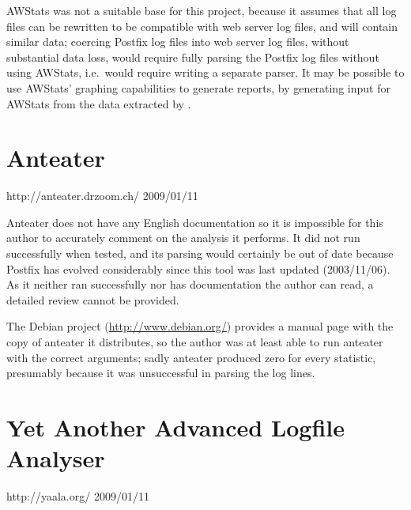 AWStats was not a suitable base for this project, because it assumes that
all log files can be rewritten to be compatible with web server log files,
and will contain similar data; coercing Postfix log files into web server
log files, without substantial data loss, would require fully parsing the
Postfix log files without using AWStats, i.e.\ would require writing a
separate parser.  It may be possible to use AWStats' graphing capabilities
to generate reports, by generating input for AWStats from the data
extracted by \parsername{}.

\section{Anteater}

{http://anteater.drzoom.ch/}
{2009/01/11}

Anteater does not have any English documentation so it is impossible for
this author to accurately comment on the analysis it performs.  It did not
run successfully when tested, and its parsing would certainly be out of
date because Postfix has evolved considerably since this tool was last
updated (2003/11/06).  As it neither ran successfully nor has documentation
the author can read, a detailed review cannot be provided.

The Debian project (\url{http://www.debian.org/}) provides a manual page
with the copy of anteater it distributes, so the author was at least able
to run anteater with the correct arguments; sadly anteater produced zero
for every statistic, presumably because it was unsuccessful in parsing the
log lines.

\section{Yet Another Advanced Logfile Analyser}

{http://yaala.org/}
{2009/01/11}

